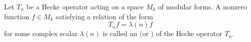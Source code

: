 Let $T_n$ be a Hecke operator acting on a space $M_k$ of modular forms. A nonzero function $f \in M_k$ satisfying a relation of the form
$$T_n f = \lambda(n) f$$
for some complex scalar $\lambda(n)$ is called an  (or ) of the Hecke operator $T_n$.
